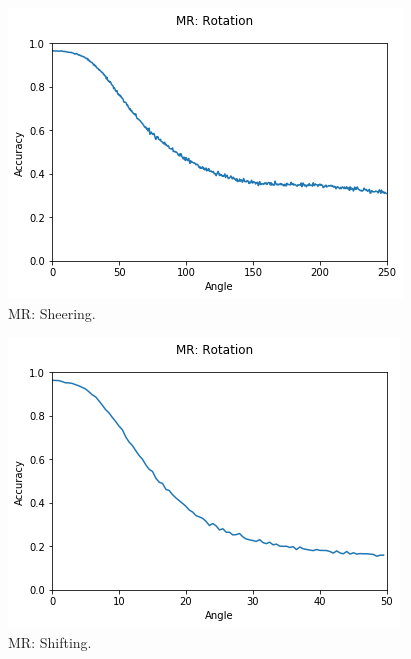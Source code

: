 \begin{figure}
  \includegraphics[width=\linewidth]{images/sheer}
  \caption{MR: Sheering.}
  \label{fig: Sheer}
\end{figure}

\begin{figure}
  \includegraphics[width=\linewidth]{images/shift}
  \caption{MR: Shifting.}
  \label{fig: Shift}
\end{figure}


